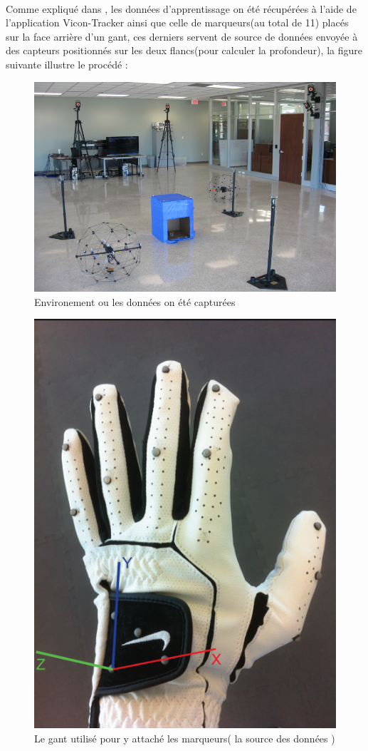\paragraph{}
Comme expliqué dans \cite{datasetDetails}, les données d'apprentissage on été récupérées à l'aide de l'application Vicon-Tracker \cite{vico} ainsi que celle de marqueurs(au total de 11) placés sur la face arrière d'un gant, ces derniers servent de source de données envoyée à des capteurs positionnés sur les deux flancs(pour calculer la profondeur), la figure suivante illustre le procédé : 
\begin{minipage}{0.5\linewidth}
	\begin{figure}[H]
		\centering
		\includegraphics[width=\linewidth]{images/cameras.png}
		\caption{\small Environement ou les données on été capturées \cite{datasetDetails}}
	\end{figure}
\end{minipage}
\begin{minipage}{0.5\linewidth}
	\begin{figure}[H]
		\centering
		\includegraphics[width=0.5\linewidth]{images/glove.png}
		\caption{\small  Le gant utilisé pour y attaché les marqueurs( la source des données ) \cite{datasetDetails}}
	\end{figure}
\end{minipage}

